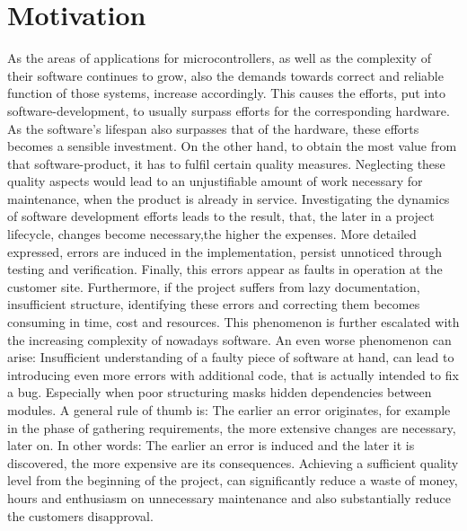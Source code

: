 \documentclass[master,english,smartquotes,apa]{hgbthesis}
\begin{document}
	\section{Motivation}
As the areas of applications for microcontrollers, as well as the complexity of their software continues to grow, also the demands towards correct and reliable function of those systems, increase accordingly. This causes the efforts, put into software-development, to usually surpass efforts for the corresponding hardware. As the software's lifespan also surpasses that of the hardware, these efforts becomes a sensible investment. On the other hand, to obtain the most value from that software-product, it has to fulfil certain quality measures. Neglecting these quality aspects would lead to an unjustifiable amount of work necessary for maintenance, when the product is already in service. Investigating the dynamics of software development efforts leads to the result, that, the later in a project lifecycle, changes become necessary,the higher the expenses. More detailed expressed, errors are induced in the implementation, persist unnoticed through testing and verification. Finally, this errors appear as faults in operation at the customer site. Furthermore, if the project suffers from lazy documentation, insufficient structure, identifying these errors and correcting them becomes consuming in time, cost and resources. This phenomenon is further escalated with the increasing complexity of nowadays software. An even worse phenomenon can arise: Insufficient understanding of a faulty piece of software at hand, can lead to introducing even more errors with additional code, that is actually intended to fix a bug. Especially when poor structuring masks hidden dependencies between modules. A general rule of thumb is: The earlier an error originates, for example in the phase of gathering requirements, the more extensive changes are necessary, later on. In other words: The earlier an error is induced and the later it is discovered, the more expensive are its consequences. Achieving a sufficient quality level from the beginning of the project, can significantly reduce a waste of money, hours and enthusiasm on unnecessary maintenance and also substantially reduce the customers disapproval.
\end{document}
